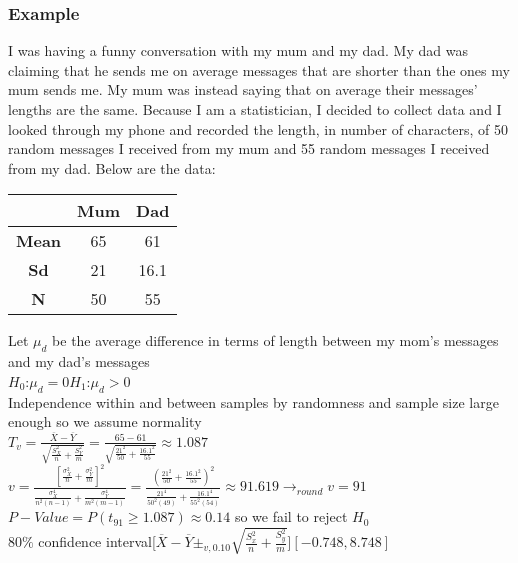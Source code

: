 \documentclass{article}
\begin{document}
\subsubsection{Example}
I was having a funny conversation with my mum and my dad. My dad was claiming
that he sends me on average messages that are shorter than the ones my mum sends
me. My mum was instead saying that on average their messages’ lengths are the
same. Because I am a statistician, I decided to collect data and I looked through my
phone and recorded the length, in number of characters, of 50 random messages I
received from my mum and 55 random messages I received from my dad. Below are
the data:
\begin{center}
    \begin{tabular}{c|c|c}
         & \textbf{Mum} & \textbf{Dad} \\
         \hline
        \textbf{Mean} & 65 & 61\\
        \hline
        \textbf{Sd} & 21 & 16.1\\
        \hline
        \textbf{N} & 50 & 55
    \end{tabular}
\end{center}
Let $\mu_d$ be the average difference in terms of length between my mom's messages and my dad's messages\\
$H_0$:$\mu_d=0$\hspace*{0.5in}$H_1$:$\mu_d>0$\\
Independence within and between samples by randomness and sample size large enough so we assume normality\\
$T_v=\frac{\overline{X}-\overline{Y}}{\sqrt{\frac{S_X^2}{n}+\frac{S_Y^2}{m}}}=\frac{65-61}{\sqrt{\frac{21^2}{50}+\frac{16.1^2}{55}}}\approx 1.087$\hspace*{0.2in}$v=\frac{[\frac{\sigma_X^2}{n}+\frac{\sigma_Y^2}{m}]^2}{\frac{\sigma_X^4}{n^2(n-1)}+\frac{\sigma_Y^4}{m^2(m-1)}}=\frac{(\frac{21^2}{50}+\frac{16.1^2}{55})^2}{\frac{21^4}{50^2(49)}+\frac{16.1^4}{55^2(54)}}\approx 91.619\rightarrow_{round} v=91$\\
$P-Value=P(t_{91}\geq 1.087)\approx 0.14$ so we fail to reject $H_0$\\
$80\%$ confidence interval\hspace*{0.2in}[$\overline{X}-\overline{Y}\pm_{v,0.10}\sqrt{\frac{S_x^2}{n}+\frac{S_y^2}{m}}$]\hspace*{0.2in}$[-0.748,8.748]$
\end{document}
